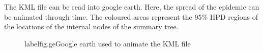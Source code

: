 \documentclass{article}
\begin{document}
The KML file can be read into google earth. Here, the spread of the epidemic can be animated through time. The coloured areas represent the 95\% HPD regions of the locations of the internal nodes of the summary tree.

\begin{figure}

\caption{label{fig.ge}Google earth used to animate the KML file}
\end{figure}



\end{document}
